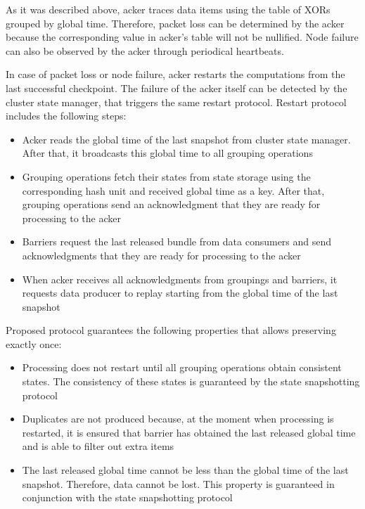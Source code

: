 As it was described above, acker traces data items using the table of XORs grouped by global time. Therefore, packet loss can be determined by the acker because the corresponding value in acker's table will not be nullified. Node failure can also be observed by the acker through periodical heartbeats. 

In case of packet loss or node failure, acker restarts the computations from the last successful checkpoint. The failure of the acker itself can be detected by the cluster state manager, that triggers the same restart protocol. Restart protocol includes the following steps:

\begin{itemize}
    \item Acker reads the global time of the last snapshot from cluster state manager. After that, it broadcasts this global time to all grouping operations
    \item Grouping operations fetch their states from state storage using the corresponding hash unit and received global time as a key. After that, grouping operations send an acknowledgment that they are ready for processing to the acker 
    \item Barriers request the last released bundle from data consumers and send acknowledgments that they are ready for processing to the acker
    \item When acker receives all acknowledgments from groupings and barriers, it requests data producer to replay starting from the global time of the last snapshot  
\end{itemize}

Proposed protocol guarantees the following properties that allows preserving exactly once:

\begin{itemize}
    \item Processing does not restart until all grouping operations obtain consistent states. The consistency of these states is guaranteed by the state snapshotting protocol
    \item Duplicates are not produced because, at the moment when processing is restarted, it is ensured that barrier has obtained the last released global time and is able to filter out extra items
    \item The last released global time cannot be less than the global time of the last snapshot. Therefore, data cannot be lost. This property is guaranteed in conjunction with the state snapshotting protocol
\end{itemize}

